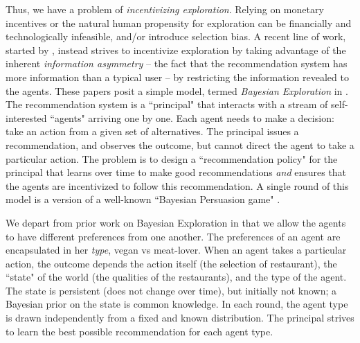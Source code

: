 Thus, we have a problem of \emph{incentivizing exploration}.
Relying on monetary incentives or the natural human propensity for exploration can be financially and technologically infeasible, and/or introduce selection bias.
%
%
A recent line of work, started by \cite{Kremer-JPE14}, instead strives to incentivize exploration by taking advantage of the inherent \emph{information asymmetry} -- the fact that the recommendation system has more information than a typical user -- by restricting the information revealed to the agents. These papers posit a simple model, termed \emph{Bayesian Exploration} in \cite{ICexplorationGames-ec16}. The recommendation system is a ``principal" that interacts with a stream of self-interested ``agents" arriving one by one. Each agent needs to make a decision: take an action from a given set of alternatives. The principal issues a recommendation, %
and observes the outcome, but cannot direct the agent to take a particular action. The problem is to design a ``recommendation policy" for the principal that learns over time to make good recommendations \emph{and} ensures that the agents are incentivized to follow this recommendation. 
A single round of this model is a version of a well-known ``Bayesian Persuasion game" \cite{Kamenica-aer11}.

We depart from prior work on Bayesian Exploration in that we allow the agents to have different preferences from one another. The preferences of an agent are encapsulated in her {\em type}, \eg vegan vs meat-lover.
When an agent takes a particular action, the outcome depends the action itself (\eg the selection of restaurant), the ``state" of the world (\eg the qualities of the restaurants), and the type of the agent. The state is persistent (does not change over time), but initially not known; a Bayesian prior on the state is common knowledge. In each round, the agent type is drawn independently from a fixed and known distribution. The principal strives to learn the best possible recommendation for each agent type.

